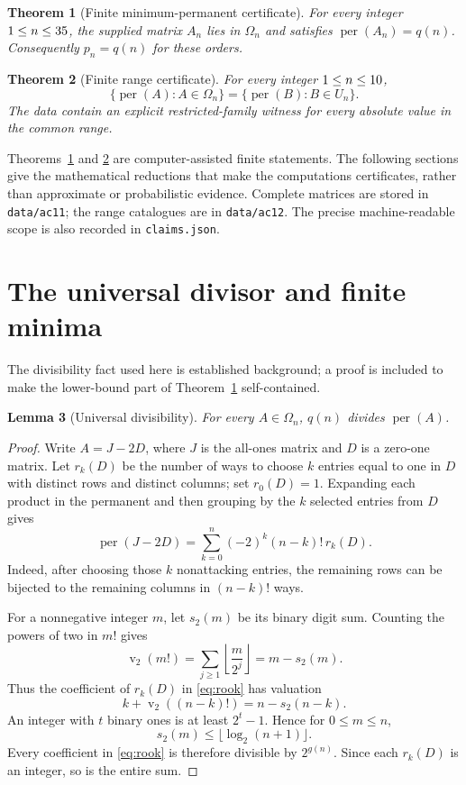 \documentclass[11pt,a4paper]{article}
\newtheorem{theorem}{Theorem}
\newtheorem{lemma}[theorem]{Lemma}
\theoremstyle{remark}\newtheorem{remark}[theorem]{Remark}
\DeclareMathOperator{\per}{per}
\DeclareMathOperator{\val}{v}
\newcommand{\Om}{\Omega}
\begin{document}
\begin{theorem}[Finite minimum-permanent certificate]\label{thm:minimum}
For every integer $1\leq n\leq35$, the supplied matrix $A_n$ lies in $\Om_n$ and satisfies $\per(A_n)=q(n)$. Consequently $p_n=q(n)$ for these orders.
\end{theorem}

\begin{theorem}[Finite range certificate]\label{thm:range}
For every integer $1\leq n\leq10$,
\[
 \{\per(A):A\in\Om_n\}=\{\per(B):B\in U_n\}.
\]
The data contain an explicit restricted-family witness for every absolute value in the common range.
\end{theorem}

Theorems~\ref{thm:minimum} and \ref{thm:range} are computer-assisted finite statements. The following sections give the mathematical reductions that make the computations certificates, rather than approximate or probabilistic evidence. Complete matrices are stored in \texttt{data/ac11}; the range catalogues are in \texttt{data/ac12}. The precise machine-readable scope is also recorded in \texttt{claims.json}.

\section{The universal divisor and finite minima}
The divisibility fact used here is established background; a proof is included to make the lower-bound part of Theorem~\ref{thm:minimum} self-contained.

\begin{lemma}[Universal divisibility]\label{lem:divisor}
For every $A\in\Om_n$, $q(n)$ divides $\per(A)$.
\end{lemma}
\begin{proof}
Write $A=J-2D$, where $J$ is the all-ones matrix and $D$ is a zero-one matrix. Let $r_k(D)$ be the number of ways to choose $k$ entries equal to one in $D$ with distinct rows and distinct columns; set $r_0(D)=1$. Expanding each product in the permanent and then grouping by the $k$ selected entries from $D$ gives
\begin{equation}\label{eq:rook}
 \per(J-2D)=\sum_{k=0}^n(-2)^k(n-k)!\,r_k(D).
\end{equation}
Indeed, after choosing those $k$ nonattacking entries, the remaining rows can be bijected to the remaining columns in $(n-k)!$ ways.

For a nonnegative integer $m$, let $s_2(m)$ be its binary digit sum. Counting the powers of two in $m!$ gives
\[
 \val_2(m!)=\sum_{j\geq1}\left\lfloor\frac{m}{2^j}\right\rfloor=m-s_2(m).
\]
Thus the coefficient of $r_k(D)$ in \eqref{eq:rook} has valuation
\[
 k+\val_2((n-k)!)=n-s_2(n-k).
\]
An integer with $t$ binary ones is at least $2^t-1$. Hence for $0\leq m\leq n$,
\[
 s_2(m)\leq\lfloor\log_2(n+1)\rfloor.
\]
Every coefficient in \eqref{eq:rook} is therefore divisible by $2^{g(n)}$. Since each $r_k(D)$ is an integer, so is the entire sum.
\end{proof}
\end{document}
